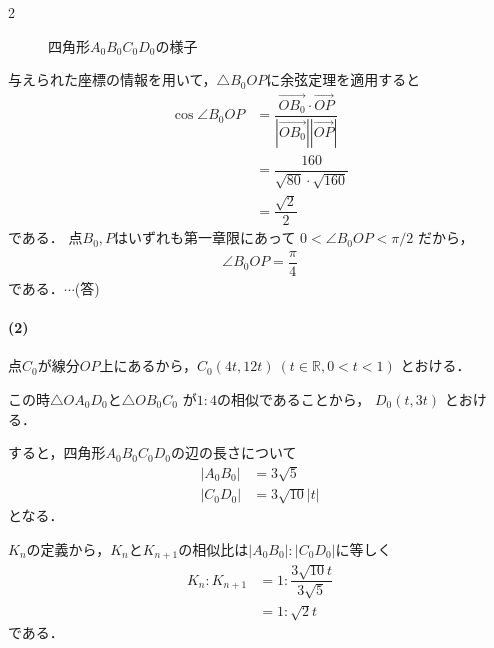 \documentclass[../../main.tex]{subfiles}
\begin{document}
\begin{multicols}{2}
\begin{figure}[H]
    \caption{四角形$A_0B_0C_0D_0$の様子}
    \label{1999-3:fig:1}
  \end{figure}

  与えられた座標の情報を用いて，$\triangle B_0OP$に余弦定理を適用すると
  \begin{align}
    \cos \angle B_0OP
    & = \dfrac{\overrightarrow{OB_0} \cdot \overrightarrow{OP}}{|\overrightarrow{OB_0}| |\overrightarrow{OP}|} \\
    & = \dfrac{160}{\sqrt{80} \cdot \sqrt{160}}                                                                \\
    & = \dfrac{\sqrt{2}}{2}
  \end{align}
  である．
  点$B_0,P$はいずれも第一章限にあって $0 < \angle B_0OP < \pi/2$ だから，
  \begin{align}
    \angle B_0OP = \dfrac{\pi}{4}
  \end{align}
  である．$\cdots$(答)

  \paragraph{(2)}
  点$C_0$が線分$OP$上にあるから，$C_0(4t, 12t) \ (t \in \mathbb{R}, 0< t < 1)$ とおける．

  この時$\triangle OA_0D_0$と$\triangle OB_0C_0$ が$1:4$の相似であることから，
  $D_0(t, 3t)$ とおける．

  すると，四角形$A_0B_0C_0D_0$の辺の長さについて
  \begin{align}
    |A_0B_0| & = 3\sqrt{5}     \\
    |C_0D_0| & = 3\sqrt{10}|t|
  \end{align}
  となる．

  $K_n$の定義から，$K_n$と$K_{n+1}$の相似比は$|A_0B_0|:|C_0D_0|$に等しく
  \begin{align}
    K_n: K_{n+1}
    & =1:\dfrac{3\sqrt{10}t}{3\sqrt{5}}  \\
    & = 1:\sqrt{2}t \label{eq:1}
  \end{align}
  である．


\end{multicols}
\end{document}
